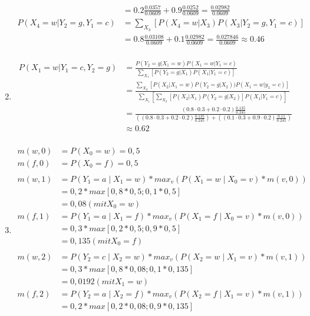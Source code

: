 \documentclass[a4paper,10pt]{article}
\begin{document}
\begin{enumerate}[~~(a)]
\begin{align*}
        &= 0.2 \frac{0.0357}{0.0609} + 0.9 \frac{0.0252}{0.0609} = \frac{0.02982}{0.0609}\\
        P(X_4 = w| Y_2 = g, Y_1 = c) &= \sum\limits_{X_3} [P(X_4 = w|X_3) P(X_3|Y_2 = g, Y_1 = c)]\\
        &= 0.8 \frac{0.03108}{0.0609} + 0.1 \frac{0.02982}{0.0609} = \frac{0.027846}{0.0609} \approx 0.46\\
    \end{align*}
    \item
    \begin{align*}
        P(X_1 = w| Y_1 = c, Y_2 = g) &= \frac{P(Y_2 = g|X_1 = w)P(X_1 = w|Y_1 = c)}{\sum\limits_{X_1} [P(Y_2 = g|X_1) P(X_1|Y_1 = c)]}\\
        &= \frac{\sum\limits_{X_2} [P(X_2|X_1 = w)P(Y_2 = g|X_2))P(X_1 = w|y_1 = c)]}{\sum\limits_{X_1} [\sum\limits_{X_2} [P(X_2|X_1)P(Y_2 = g|X_2)]P(X_1|Y_1 = c)]}\\
        &= \frac{(0.8 \cdot 0.3 + 0.2 \cdot 0.2) \frac{0.135}{0.245}}{((0.8 \cdot 0.3 + 0.2 \cdot 0.2) \frac{0.135}{0.245}) + ((0.1 \cdot 0.3 + 0.9 \cdot 0.2) \frac{0.11}{0.245})}\\
        &\approx 0.62\\
    \end{align*}
    \item
	\begin{align*}
		m(w,0) &= P(X_0 = w) = 0,5 \\
		m(f,0) &= P(X_0 = f) = 0,5\\ \\
		m(w,1) &= P(Y_1 = a \mid X_1 = w) * max_v (P(X_1 = w \mid X_0 = v) * m(v,0)) \\
		&= 0,2 * max[0,8*0,5;0,1*0,5]\\
		&= 0,08  (mit X_0 = w)\\
		m(f,1) &= P(Y_1 = a \mid X_1 = f) * max_v (P(X_1 = f \mid X_0 = v) * m(v,0)) \\
		&= 0,3 * max[0,2*0,5;0,9*0,5]\\
		&= 0,135  (mit X_0 = f)\\ \\
		m(w,2) &= P(Y_2 = c \mid X_2 = w) * max_v (P(X_2 = w \mid X_1 = v) * m(v,1)) \\
		&= 0,3 * max[0,8*0,08;0,1*0,135]\\
		&= 0,0192  (mit X_1 = w)\\
		m(f,2) &= P(Y_2 = a \mid X_2 = f) * max_v (P(X_2 = f \mid X_1 = v) * m(v,1)) \\
		&= 0,2 * max[0,2*0,08;0,9*0,135]\\

\end{align*}
\end{enumerate}
\end{document}
